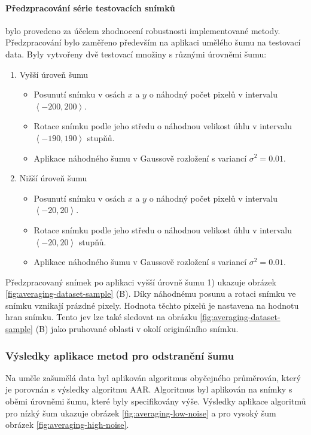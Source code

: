 \paragraph{Předzpracování série testovacích snímků} 
bylo provedeno za účelem zhodnocení robustnosti implementované metody. Předzpracování bylo zaměřeno především na aplikaci umělého šumu na testovací data. Byly vytvořeny dvě testovací množiny s různými úrovněmi šumu:
\begin{enumerate}
\item Vyšší úroveň šumu
\begin{itemize}
\item Posunutí snímku v osách $x$ a $y$ o náhodný počet pixelů v intervalu $\left \langle -200,200 \right \rangle$.
\item Rotace snímku podle jeho středu o náhodnou velikost úhlu v intervalu $\left \langle -190,190 \right \rangle$ stupňů.
\item Aplikace náhodného šumu v Gaussově rozložení s variancí $\sigma^2 = 0.01$.
\end{itemize}
\item Nižší úroveň šumu
\begin{itemize}
\item Posunutí snímku v osách $x$ a $y$ o náhodný počet pixelů v intervalu $\left \langle -20,20 \right \rangle$.
\item Rotace snímku podle jeho středu o náhodnou velikost úhlu v intervalu $\left \langle -20,20 \right \rangle$ stupňů.
\item Aplikace náhodného šumu v Gaussově rozložení s variancí $\sigma^2 = 0.01$.
\end{itemize}
\end{enumerate}

Předzpracovaný snímek po aplikaci vyšší úrovně šumu 1) ukazuje obrázek \ref{fig:averaging-dataset-sample} (B). Díky náhodnému posunu a rotaci snímku ve snímku vznikají prázdné pixely. Hodnota těchto pixelů je nastavena na hodnotu hran snímku. Tento jev lze také sledovat na obrázku \ref{fig:averaging-dataset-sample} (B) jako pruhované oblasti v okolí originálního snímku.

\subsubsection{Výsledky aplikace metod pro odstranění šumu}
Na uměle zašumělá data byl aplikován algoritmus obyčejného průměrován, který je porovnán s výsledky algoritmu AAR. Algoritmus byl aplikován na snímky s oběmi úrovněmi šumu, které byly specifikovány výše. Výsledky aplikace algoritmů pro nízký šum ukazuje obrázek \ref{fig:averaging-low-noise} a pro vysoký šum obrázek \ref{fig:averaging-high-noise}.

